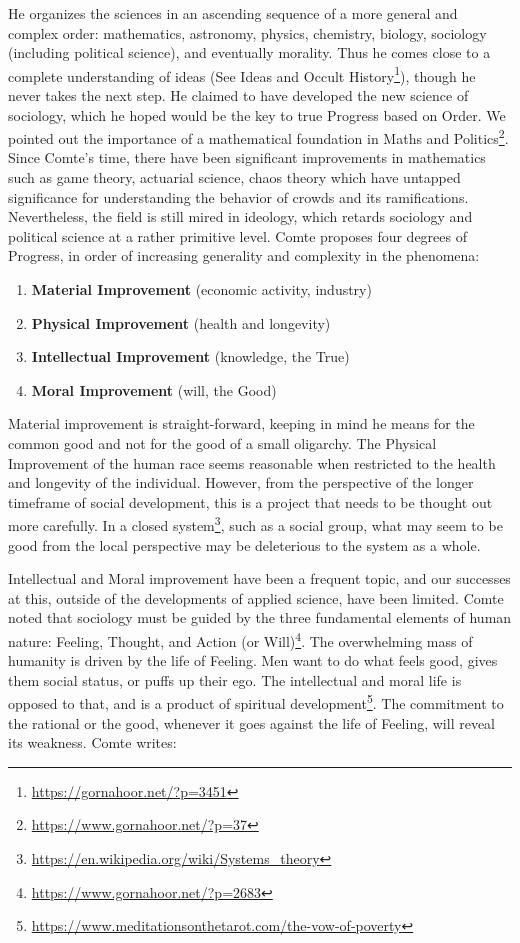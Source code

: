 He organizes the sciences in an ascending sequence of a more general and complex order: mathematics, astronomy, physics, chemistry, biology, sociology (including political science), and eventually morality. Thus he comes close to a complete understanding of ideas (See Ideas and Occult History\footnote{\url{https://gornahoor.net/?p=3451}}), though he never takes the next step. He claimed to have developed the new science of sociology, which he hoped would be the key to true Progress based on Order. We pointed out the importance of a mathematical foundation in Maths and Politics\footnote{\url{https://www.gornahoor.net/?p=37}}. Since Comte's time, there have been significant improvements in mathematics such as game theory, actuarial science, chaos theory which have untapped significance for understanding the behavior of crowds and its ramifications. Nevertheless, the field is still mired in ideology, which retards sociology and political science at a rather primitive level. Comte proposes four degrees of Progress, in order of increasing generality and complexity in the phenomena:

\begin{enumerate}


\item \textbf{Material Improvement} (economic activity, industry)


\item \textbf{Physical Improvement} (health and longevity)


\item \textbf{Intellectual Improvement} (knowledge, the True)


\item \textbf{Moral Improvement} (will, the Good)

\end{enumerate}


Material improvement is straight-forward, keeping in mind he means for the common good and not for the good of a small oligarchy. The Physical Improvement of the human race seems reasonable when restricted to the health and longevity of the individual. However, from the perspective of the longer timeframe of social development, this is a project that needs to be thought out more carefully. In a closed system\footnote{\url{https://en.wikipedia.org/wiki/Systems\_theory}}, such as a social group, what may seem to be good from the local perspective may be deleterious to the system as a whole.

Intellectual and Moral improvement have been a frequent topic, and our successes at this, outside of the developments of applied science, have been limited. Comte noted that sociology must be guided by the three fundamental elements of human nature: Feeling, Thought, and Action (or Will)\footnote{\url{https://www.gornahoor.net/?p=2683}}. The overwhelming mass of humanity is driven by the life of Feeling. Men want to do what feels good, gives them social status, or puffs up their ego. The intellectual and moral life is opposed to that, and is a product of spiritual development\footnote{\url{https://www.meditationsonthetarot.com/the-vow-of-poverty}}. The commitment to the rational or the good, whenever it goes against the life of Feeling, will reveal its weakness. Comte writes:

